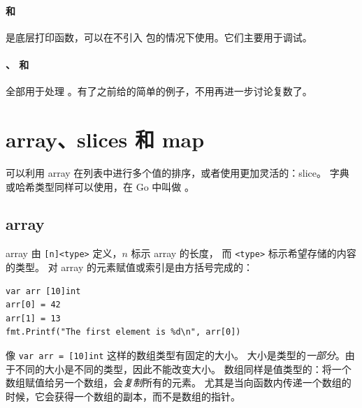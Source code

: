 \paragraph{ 和 } 是底层打印函数，可以在不引入
 包的情况下使用。它们主要用于调试。

\paragraph{、 和 } 全部用于处理
。有了之前给的简单的例子，不用再进一步讨论复数了。


\section{array、slices 和 map}
\label{sec:arrays}
可以利用 array 在列表中进行多个值的排序，或者使用更加灵活的：slice。
字典或哈希类型同样可以使用，在 Go 中叫做 。

\subsection{array}
array 由 \verb|[n]<type>| 定义，$n$ 标示 array 的长度，
而 \verb|<type>| 标示希望存储的内容的类型。
对 array 的元素赋值或索引是由方括号完成的：
\begin{lstlisting}
var arr [10]int
arr[0] = 42
arr[1] = 13
fmt.Printf("The first element is %d\n", arr[0])
\end{lstlisting}
像 \lstinline{var arr = [10]int} 这样的数组类型有固定的大小。
大小是类型的\emph{一部分}。由于不同的大小是不同的类型，因此不能改变大小。
数组同样是值类型的：将一个数组赋值给另一个数组，会\emph{复制}所有的元素。
尤其是当向函数内传递一个数组的时候，它会获得一个数组的副本，而不是数组的指针。


